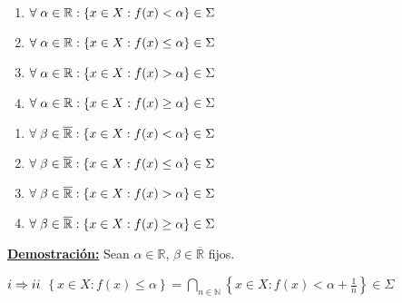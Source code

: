 \documentclass[12pt,a4paper]{article}
\newcommand{\R}{\mathbb{R}}
\newcommand{\N}{\mathbb{N}}
\newcommand{\dem}{
    \noindent \underline{\textbf{Demostración:}}
}
\begin{document}
\vspace{5mm}
\begin{minipage}{0.5\textwidth}
    \begin{enumerate}[leftmargin=0mm, label=\roman*)]
        \item $\forall \hspace{1mm} \alpha \in \R : \{x \in X : f(x) < \alpha \} \in \Sigma$
        \item $\forall \hspace{1mm} \alpha \in \R : \{x \in X : f(x) \leq \alpha \} \in \Sigma$
        \item $\forall \hspace{1mm} \alpha \in \R : \{x \in X : f(x) > \alpha \} \in \Sigma$
        \item $\forall \hspace{1mm} \alpha \in \R : \{x \in X : f(x) \geq \alpha \} \in \Sigma$
    \end{enumerate}
\end{minipage}
\begin{minipage}{0.5\textwidth}
    \begin{enumerate}[leftmargin=6mm, label=\roman*')]
        \item $\forall \hspace{1mm} \beta \in \overline{\R} : \{x \in X : f(x) < \alpha \} \in \Sigma$
        \item $\forall \hspace{1mm} \beta \in \overline{\R} : \{x \in X : f(x) \leq \alpha \} \in \Sigma$
        \item $\forall \hspace{1mm} \beta \in \overline{\R} : \{x \in X : f(x) > \alpha \} \in \Sigma$
        \item $\forall \hspace{1mm} \beta \in \overline{\R} : \{x \in X : f(x) \geq \alpha \} \in \Sigma$
    \end{enumerate}
\end{minipage}

\vspace{8mm}
\dem Sean $\alpha\in \R$, $\beta \in \overline{\R}$ fijos.

\vspace{2mm}
\begin{tcolorbox}
    $\romannumeral 1 \Rightarrow \romannumeral 2$ \hspace{3mm} $\left\{x \in X : f(x) \leq \alpha \right\} = \displaystyle \bigcap_{n \in \N} \left\{x \in X : f(x) < \alpha  + \frac{1}{n}\right\} \in \Sigma$
\end{tcolorbox}
\end{document}
